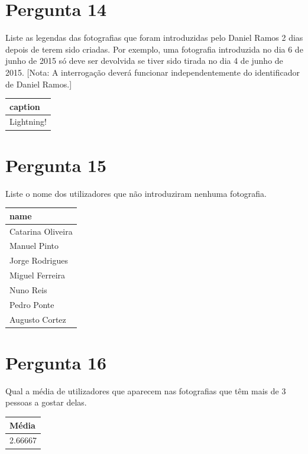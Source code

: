 \documentclass[type=normal, year=2014/15]{bdad_exam}
\begin{document}
{\section{Pergunta 14}
Liste as legendas das fotografias que foram introduzidas pelo Daniel Ramos 2 dias depois de terem sido criadas. Por exemplo, uma fotografia introduzida no dia 6 de junho de 2015 só deve ser devolvida se tiver sido tirada no dia 4 de junho de 2015. [Nota: A interrogação deverá funcionar independentemente do identificador de Daniel Ramos.]
\begin{center} \begin{tabular}{l}
    \textbf{caption} \\ \hline
    Lightning!
\end{tabular} \end{center}


\section{Pergunta 15}
Liste o nome dos utilizadores que não introduziram nenhuma fotografia.
\begin{center} \begin{tabular}{l}
    \textbf{name}     \\ \hline
    Catarina Oliveira \\
    Manuel Pinto      \\
    Jorge Rodrigues   \\
    Miguel Ferreira   \\
    Nuno Reis         \\
    Pedro Ponte       \\
    Augusto Cortez
\end{tabular} \end{center}


\section{Pergunta 16}
Qual a média de utilizadores que aparecem nas fotografias que têm mais de 3 pessoas a gostar delas.
\begin{center} \begin{tabular}{l}
    \textbf{Média}     \\ \hline
    2.66667
\end{tabular} \end{center}


}
\end{document}
